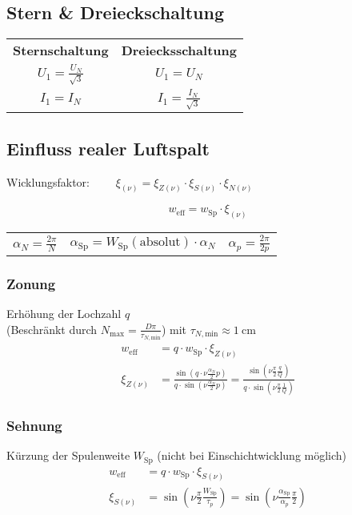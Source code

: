 \begin{sectionbox}
\subsection{Stern \& Dreieckschaltung}
\begin{emphbox}
\begin{tabularx}{\columnwidth}{C |C}
\textbf{Sternschaltung} & \textbf{Dreiecksschaltung}\\
$U_1 = \frac{U_N}{\sqrt{3}}$ & $U_1 = U_N$\\
$I_1 = I_N$ & $I_1 = \frac{I_N}{\sqrt{3}}$\\
\end{tabularx}
\end{emphbox}
\end{sectionbox}

\begin{sectionbox}
\subsection{Einfluss realer Luftspalt}
\begin{symbolbox}
  Wicklungsfaktor: $\qquad\xi_{(\nu)} = \xi_{Z(\nu)}\cdot\xi_{S(\nu)}\cdot\xi_{N(\nu)}$
\end{symbolbox}
\[w_\text{eff} = w_\text{Sp}\cdot\xi_{(\nu)}\]
\begin{tabularx}{\columnwidth}{cCc}
$\alpha_N = \frac{2\pi}{N}$ & $\alpha_\text{Sp} = W_\text{Sp}(\text{absolut})\cdot\alpha_N$ & $\alpha_p = \frac{2\pi}{2p}$
\end{tabularx}

\subsubsection{Zonung}
Erhöhung der Lochzahl $q$\\
(Beschränkt durch $N_\text{max} = \frac{D\pi}{\tau_{N,\text{min}}}$) mit $\tau_{N,\text{min}} \approx \SI{1}{\centi\meter}$
\begin{align*}
w_\text{eff} &= q\cdot w_\text{Sp}\cdot\xi_{Z(\nu)}\\
\xi_{Z(\nu)} &= \frac{\sin\left(q\cdot\nu\frac{\alpha_N}{2}p\right)}{q\cdot\sin\left(\nu\frac{\alpha_N}{2}p\right)} = \frac{\sin\left(\nu\frac{\pi}{2}\frac{q}{Q}\right)}{q\cdot\sin\left(\nu\frac{\pi}{2}\frac{1}{Q}\right)}
\end{align*}

\subsubsection{Sehnung}
Kürzung der Spulenweite $W_\text{Sp}$ (nicht bei Einschichtwicklung möglich)\\
\begin{align*}
w_\text{eff} &= q\cdot w_\text{Sp}\cdot\xi_{S(\nu)}\\
\xi_{S(\nu)} &= \sin\left(\nu\frac{\pi}{2}\frac{W_\text{Sp}}{\tau_p}\right) = \sin\left(\nu\frac{\alpha_\text{Sp}}{\alpha_p}\frac{\pi}{2}\right)
\end{align*}


\end{sectionbox}
